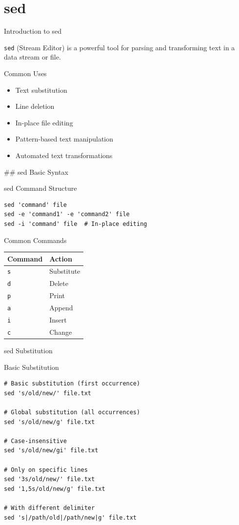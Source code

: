 \documentclass[presentation,aspectratio=1610]{beamer}
\begin{document}
\section*{sed}
\label{sec:org61f8c7e}

\begin{frame}[label={sec:org71d71e3},fragile]{Introduction to sed}
 \begin{definition}\label{sec:org6d27412}
\texttt{sed} (Stream Editor) is a powerful tool for parsing and transforming text in a data stream or file.
\end{definition}
\begin{block}{Common Uses}
\begin{itemize}
\item Text substitution
\item Line deletion
\item In-place file editing
\item Pattern-based text manipulation
\item Automated text transformations
\end{itemize}

\#\# sed Basic Syntax
\end{block}
\begin{block}{sed Command Structure}
\begin{verbatim}
sed 'command' file
sed -e 'command1' -e 'command2' file
sed -i 'command' file  # In-place editing
\end{verbatim}
\end{block}
\begin{exampleblock}{Common Commands}\label{sec:orgff9f099}
\begin{center}
\begin{tabular}{ll}
Command & Action\\
\hline
\texttt{s} & Substitute\\
\texttt{d} & Delete\\
\texttt{p} & Print\\
\texttt{a} & Append\\
\texttt{i} & Insert\\
\texttt{c} & Change\\
\end{tabular}
\end{center}
\end{exampleblock}
\end{frame}
\begin{frame}[label={sec:org9a3cd03},fragile]{sed Substitution}
 \begin{block}{Basic Substitution}
\begin{verbatim}
# Basic substitution (first occurrence)
sed 's/old/new/' file.txt

# Global substitution (all occurrences)
sed 's/old/new/g' file.txt

# Case-insensitive
sed 's/old/new/gi' file.txt

# Only on specific lines
sed '3s/old/new/' file.txt
sed '1,5s/old/new/g' file.txt

# With different delimiter
sed 's|/path/old|/path/new|g' file.txt
\end{verbatim}
\end{block}
\end{frame}
\end{document}
